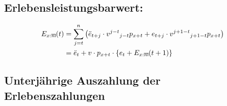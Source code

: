 \documentclass[a4paper,10pt]{article}
\makeatletter
\newcommand{\xn}{{\act[x]{n}}}
\DeclareRobustCommand{\act}[2][]{%
\def\arraystretch{0}%
\setlength\arraycolsep{0.5pt}%
\setlength\arrayrulewidth{0.5pt}%
\setbox0=\hbox{$\scriptstyle#1\ifx#1\empty{asdf}\else:\fi#2$}%
\begin{array}[b]{*2{@{}>{\scriptstyle}c}|}
\cline{2-2}%
\rule[1.25pt]{0pt}{\ht0}%
#1\ifx#1\empty\else:\fi & #2%
\end{array}%
}
\makeatother
\begin{document}
\subsection{Erlebensleistungsbarwert:}
\begin{align*} 
E_\xn(t) &= \sum_{j=t}^n \left(\ddot{e}_{t+j} \cdot v^{j-t}  {}_{j-t}p_{x+t} + e_{t+j} \cdot v^{j+1-t} {}_{j+1-t}p_{x+t} \right)\\
	  &= \ddot{e}_{t} + v \cdot p_{x+t} \cdot \left\{ e_t + E_\xn(t+1)\right\}\\
\end{align*}

\subsection{Unterjährige Auszahlung der Erlebenszahlungen}
\end{document}
